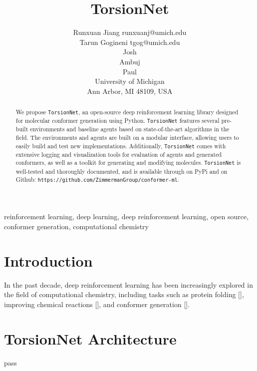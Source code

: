 \documentclass[twoside,11pt]{article}
\newcommand{\code}[1]{\texttt{#1}}
\begin{document}
\title{TorsionNet}

\author{\name Runxuan Jiang \email runxuanj@umich.edu \\
       \name Tarun Gogineni \email tgog@umich.edu \\
       \name Josh \\
       \name Ambuj \\
       \name Paul \\
       \addr
       University of Michigan\\
       Ann Arbor, MI 48109, USA} 

\maketitle

\begin{abstract}%
  We propose \code{TorsionNet}, an open-source deep reinforcement learning library designed for molecular conformer generation using Python. \code{TorsionNet} features several pre-built environments and baseline agents based on state-of-the-art algorithms in the field. The environments and agents are built on a modular interface, allowing users to easily build and test new implementations. Additionally, \code{TorsionNet} comes with extensive logging and visualization tools for evaluation of agents and generated conformers, as well as a toolkit for generating and modifying molecules. \code{TorsionNet} is well-tested and thoroughly documented, and is available through on PyPi and on Github: \code{https://github.com/ZimmermanGroup/conformer-ml}.
\end{abstract}

\begin{keywords}
  reinforcement learning, deep learning, deep reinforcement learning, open source, conformer generation, computational chemistry
\end{keywords}

\section{Introduction}
In the past decade, deep reinforcement learning has been increasingly explored in the field of computational chemistry,
including tasks such as protein folding [], improving chemical reactions [], and conformer generation [].

\section{TorsionNet Architecture}
pass
\end{document}
